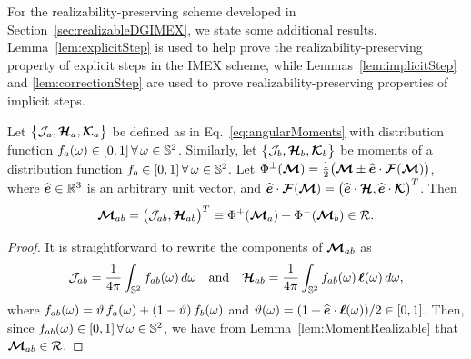 For the realizability-preserving scheme developed in Section~\ref{sec:realizableDGIMEX}, we state some additional results.  
Lemma~\ref{lem:explicitStep} is used to help prove the realizability-preserving property of explicit steps in the IMEX scheme, while Lemmas~\ref{lem:implicitStep} and \ref{lem:correctionStep} are used to prove realizability-preserving properties of implicit steps.  
\begin{lemma}
  Let $\big\{\mathcal{J}_{a},\boldsymbol{\mathcal{H}}_{a},\boldsymbol{\mathcal{K}}_{a}\big\}$ be defined as in Eq.~\eqref{eq:angularMoments} with distribution function $f_{a}(\omega)\in[0,1]\,\forall\,\omega\in\mathbb{S}^{2}$.  
  Similarly, let $\big\{\mathcal{J}_{b},\boldsymbol{\mathcal{H}}_{b},\boldsymbol{\mathcal{K}}_{b}\big\}$ be moments of a distribution function $f_{b}\in[0,1]\,\forall\,\omega\in\mathbb{S}^{2}$.  
  Let $\Phi^{\pm}(\boldsymbol{\mathcal{M}})=\frac{1}{2}\big(\boldsymbol{\mathcal{M}}\pm\widehat{\boldsymbol{e}}\cdot\boldsymbol{\mathcal{F}}(\boldsymbol{\mathcal{M}})\big)$, where $\widehat{\boldsymbol{e}}\in\mathbb{R}^{3}$ is an arbitrary unit vector, and $\widehat{\boldsymbol{e}}\cdot\boldsymbol{\mathcal{F}}(\boldsymbol{\mathcal{M}})=\big(\widehat{\boldsymbol{e}}\cdot\boldsymbol{\mathcal{H}},\widehat{\boldsymbol{e}}\cdot\boldsymbol{\mathcal{K}}\big)^{T}$.  
  Then
  \begin{equation*}
    \boldsymbol{\mathcal{M}}_{ab} = \big(\mathcal{J}_{ab},\boldsymbol{\mathcal{H}}_{ab}\big)^{T} \equiv \Phi^{+}(\boldsymbol{\mathcal{M}}_{a})+\Phi^{-}(\boldsymbol{\mathcal{M}}_{b})\in\mathcal{R}.
  \end{equation*}
  \label{lem:explicitStep}
\end{lemma}
\begin{proof}
  It is straightforward to rewrite the components of $\boldsymbol{\mathcal{M}}_{ab}$ as
  \begin{equation*}
    \mathcal{J}_{ab}=\frac{1}{4\pi}\int_{\mathbb{S}^{2}}f_{ab}(\omega)\,d\omega
    \quad\text{and}\quad
    \boldsymbol{\mathcal{H}}_{ab}=\frac{1}{4\pi}\int_{\mathbb{S}^{2}}f_{ab}(\omega)\,\boldsymbol{\ell}(\omega)\,d\omega,
  \end{equation*}
  where $f_{ab}(\omega)=\vartheta\,f_{a}(\omega)+(1-\vartheta)\,f_{b}(\omega)$ and $\vartheta(\omega)=(1+\widehat{\boldsymbol{e}}\cdot\boldsymbol{\ell}(\omega))/2\in[0,1]$.  
  Then, since $f_{ab}(\omega)\in[0,1]\,\forall\,\omega\in\mathbb{S}^{2}$, we have from Lemma~\ref{lem:MomentRealizable} that $\boldsymbol{\mathcal{M}}_{ab}\in\mathcal{R}$.  
\end{proof}

